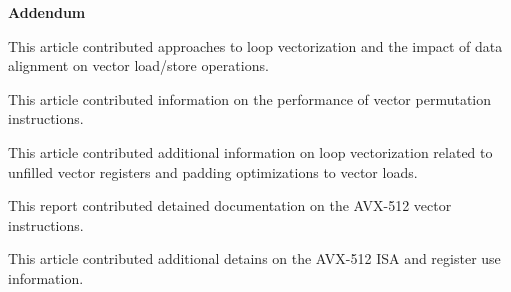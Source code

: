 \documentclass[12pt]{article}
\theoremstyle{definition}
\theoremstyle{remark}
\begin{document}
\textbf{Addendum}

\begin{enumerate}[label={[\arabic*]}]
	\item This article contributed approaches to loop vectorization and the impact of data alignment on vector load/store operations.
	\item This article contributed information on the performance of vector permutation instructions.
	\item This article contributed additional information on loop vectorization related to unfilled vector registers and padding optimizations to vector loads.
	\item This report contributed detained documentation on the AVX-512 vector instructions.
	\item This article contributed additional detains on the AVX-512 ISA and register use information.
\end{enumerate}
\end{document}
